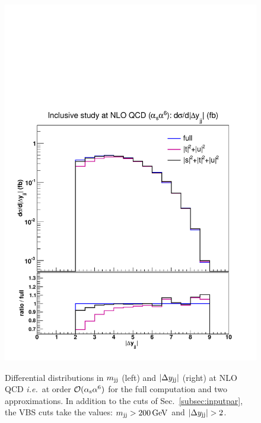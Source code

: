 \begin{figure}[hbt]
{\includegraphics[scale=0.35]{figures/scanfigures/dyjj_nlo.pdf}}
\caption{
Differential distributions in $m_{\text{j}\text{j}}$ (left) and $|\Delta y_{\text{j}\text{j}}|$ (right) at NLO QCD \emph{i.e.}\ at order $\mathcal{O}(\alpha_\text{s}\alpha^6)$ for the full computation and two approximations.
In addition to the cuts of Sec.~\ref{subsec:inputpar}, the VBS cuts take the values: $m_{\text{j}\text{j}}>200 \,\text{GeV}$ and $|\Delta y_{\Pj\Pj}|>2$.} 
\label{fig:mjjdyjj_1d_1}
\end{figure}



